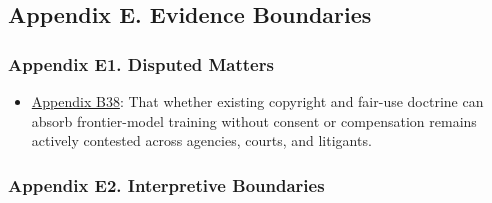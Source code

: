 \documentclass[
  american,
  11pt,
  letterpaper,
]{article}
\providecommand{\tightlist}{%
  \setlength{\itemsep}{0pt}\setlength{\parskip}{0pt}}
\begin{document}
\subsection{Appendix E. Evidence
Boundaries}\label{appendix-e.-evidence-boundaries}

\subsubsection{Appendix E1. Disputed
Matters}\label{appendix-e1-disputed-matters}

\begin{itemize}
\tightlist
\item
  \hyperref[appendix-b38-whether-existing-copyright-and-fair-use-doctrine-can-absorb-frontier-model-traini]{Appendix
  B38}: That whether existing copyright and fair-use doctrine can absorb
  frontier-model training without consent or compensation remains
  actively contested across agencies, courts, and litigants.
\end{itemize}

\subsubsection{Appendix E2. Interpretive
Boundaries}\label{appendix-e2-interpretive-boundaries}
\end{document}

